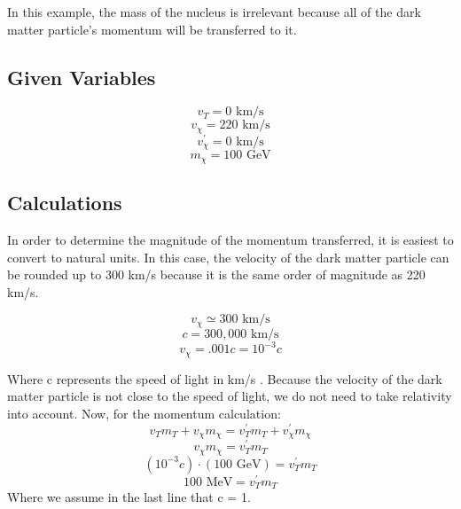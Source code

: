 \documentclass{article}
\begin{document}
In this example, the mass of the nucleus is irrelevant because all of the dark matter particle's momentum will be transferred to it. 

\subsection{Given Variables}
$$v_{T} = 0 \textrm{ km/s}$$
$$v_{\chi } = 220 \textrm{ km/s}$$
$$v^{\prime}_{\chi } = 0 \textrm{ km/s}$$
$$m_{\chi} = 100 \textrm{ GeV} $$
\subsection{Calculations}
In order to determine the magnitude of the momentum transferred, it is easiest to convert to natural units. In this case, the velocity of the dark matter particle can be rounded up to 300 km/s because it is the same order of magnitude as 220 km/s.

$$ v_\chi \simeq 300 \textrm{ km/s}$$
$$ c = 300,000 \textrm{ km/s}$$
$$ v_\chi = .001 c = 10^{-3}c$$

Where c represents the speed of light in km/s . Because the velocity of the dark matter particle is not close to the speed of light, we do not need to take relativity into account. Now, for the momentum calculation:
$$v_{T}m_{T} + v_{\chi}m_{\chi} = v^{\prime}_{T}m_{T} + v^{\prime}_{\chi}m_{\chi} $$
$$v_{\chi}m_{\chi} = v^{\prime}_{T}m_{T}$$
$$(10^{-3}c)\cdot (100 \textrm{ GeV}) = v^{\prime}_{T}m_{T} $$
$$100 \textrm{ MeV} = v^{\prime}_{T}m_{T} $$
Where we assume in the last line that c = 1.
\end{document}
